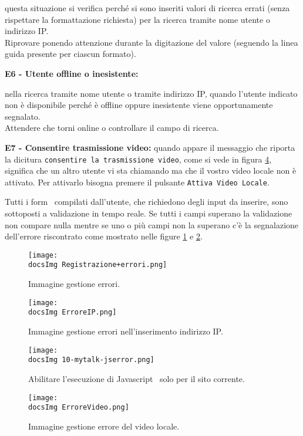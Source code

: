 {\begin{itemize}
{		questa situazione si verifica perché si sono inseriti valori di ricerca errati (senza rispettare la formattazione richiesta) per la ricerca tramite nome utente o indirizzo IP.\\
		Riprovare ponendo attenzione durante la digitazione del valore (seguendo la linea guida presente per ciascun formato).
	}
	\item \textbf{E6 - Utente offline o inesistente: }{
		nella ricerca tramite nome utente o tramite indirizzo IP, quando l’utente indicato non è disponibile perché è offline oppure inesistente viene opportunamente segnalato.\\
		 Attendere che torni online o controllare il campo di ricerca.
	\item \textbf{E7 - Consentire trasmissione video: }{
		quando appare il messaggio che riporta la dicitura \texttt{consentire la trasmissione video}, come si vede in figura \ref{fig:ErroreVideo}, significa che un altro utente vi sta chiamando ma che il vostro video locale non è attivato. Per attivarlo bisogna premere il pulsante \texttt{Attiva Video Locale}.
		} 
	}
\end{itemize}

Tutti i form\g~ compilati dall'utente, che richiedono degli input da inserire, sono sottoposti a validazione in tempo reale. Se tutti i campi superano la validazione non compare nulla mentre se uno o più campi non la superano c'è la segnalazione dell'errore riscontrato come mostrato nelle figure \ref{fig:Errori} e \ref{fig:ErroreIP}.

\begin{center}
\begin{figure}[h]
	\centering
	\texttt{[image: \\docsImg Registrazione+errori.png]}
	\caption{Immagine gestione errori.}
	\label{fig:Errori}
\end{figure}
\end{center}

\begin{center}
\begin{figure}[h]
	\centering
	\texttt{[image: \\docsImg ErroreIP.png]}
	\caption{Immagine gestione errori nell'inserimento indirizzo IP.}
	\label{fig:ErroreIP}
\end{figure}
\end{center}

\begin{center}
\begin{figure}[h]
	\centering
	\texttt{[image: \\docsImg 10-mytalk-jserror.png]}
	\caption{Abilitare l'esecuzione di Javascript\g~ solo per il sito corrente.}
	\label{fig:JSErr}
\end{figure}
\end{center}

\begin{center}
\begin{figure}[h]
	\centering
	\texttt{[image: \\docsImg ErroreVideo.png]}
	\caption{Immagine gestione errore del video locale.}
	\label{fig:ErroreVideo}
\end{figure}
\end{center}
\clearpage
}